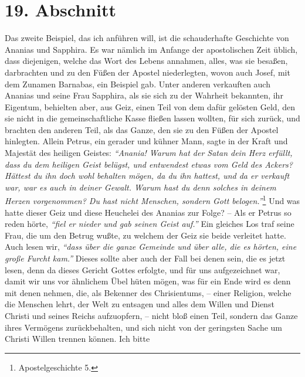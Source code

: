 \section{19. Abschnitt} \label{kap13_ab19}

 Das zweite Beispiel, das ich anführen will, ist die
schauderhafte Geschichte von
Ananias und Sapphira. Es war
nämlich im Anfange der apostolischen Zeit
üblich, dass diejenigen, welche das Wort des Lebens annahmen, alles, was
sie besaßen, darbrachten und zu den Füßen der Apostel niederlegten, wovon auch
Josef, mit dem Zunamen Barnabas, ein Beispiel gab. Unter anderen verkauften auch
Ananias und seine Frau Sapphira, als sie sich zu der Wahrheit bekannten, ihr
Eigentum, behielten aber, aus Geiz, einen Teil von dem dafür gelösten Geld,
den sie nicht in die gemeinschaftliche Kasse fließen lassen wollten, für sich
zurück, und brachten den anderen Teil, als das Ganze, den sie zu den Füßen der
Apostel hinlegten. Allein Petrus, ein gerader und kühner Mann, sagte in der
Kraft und Majestät des heiligen Geistes:
\textit{"`Anania! Warum hat der Satan dein Herz
erfüllt, dass du dem heiligen Geist belügst, und entwendest etwas vom Geld des
Ackers? Hättest du ihn doch wohl behalten mögen, da du ihn hattest, und da er
verkauft war, war es auch in deiner Gewalt. Warum hast du denn solches in deinem
Herzen vorgenommen? Du hast nicht Menschen, sondern Gott belogen."'}\footnote{Apostelgeschichte 5.}
Und was hatte dieser Geiz und diese Heuchelei des Ananias zur
Folge?
-- Als er Petrus so reden hörte,
\textit{"`fiel er nieder und gab seinen Geist auf."'}
Ein gleiches Los traf seine Frau, die um den Betrug wußte, zu welchem der Geiz
sie beide verleitet hatte. Auch lesen wir,
\textit{"`dass über die ganze Gemeinde und über
alle, die es hörten, eine große Furcht kam."'}
Dieses sollte aber auch der Fall
bei denen sein, die es jetzt lesen, denn da dieses Gericht Gottes
 erfolgte, und
für uns aufgezeichnet war, damit wir uns vor ähnlichem Übel hüten mögen, was
für ein Ende wird es denn mit denen nehmen, die, als Bekenner des
Chrisientums, -- einer Religion,
welche die Menschen lehrt, der Welt zu
entsagen und alles dem Willen und Dienst Christi und
seines Reichs aufzuopfern,
-- nicht bloß einen Teil, sondern das Ganze ihres Vermögens zurückbehalten, und
sich nicht von der geringsten Sache um Christi Willen trennen können. Ich bitte

